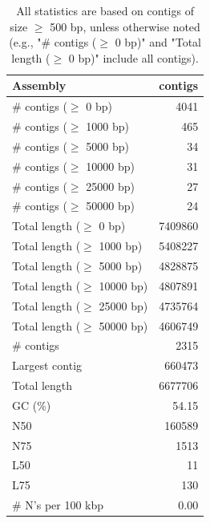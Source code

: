 \documentclass[12pt,a4paper]{article}
\begin{document}
\begin{table}[ht]
\begin{center}
\caption{All statistics are based on contigs of size $\geq$ 500 bp, unless otherwise noted (e.g., "\# contigs ($\geq$ 0 bp)" and "Total length ($\geq$ 0 bp)" include all contigs).}
\begin{tabular}{|l*{1}{|r}|}
\hline
Assembly & contigs \\ \hline
\# contigs ($\geq$ 0 bp) & 4041 \\ \hline
\# contigs ($\geq$ 1000 bp) & 465 \\ \hline
\# contigs ($\geq$ 5000 bp) & 34 \\ \hline
\# contigs ($\geq$ 10000 bp) & 31 \\ \hline
\# contigs ($\geq$ 25000 bp) & 27 \\ \hline
\# contigs ($\geq$ 50000 bp) & 24 \\ \hline
Total length ($\geq$ 0 bp) & 7409860 \\ \hline
Total length ($\geq$ 1000 bp) & 5408227 \\ \hline
Total length ($\geq$ 5000 bp) & 4828875 \\ \hline
Total length ($\geq$ 10000 bp) & 4807891 \\ \hline
Total length ($\geq$ 25000 bp) & 4735764 \\ \hline
Total length ($\geq$ 50000 bp) & 4606749 \\ \hline
\# contigs & 2315 \\ \hline
Largest contig & 660473 \\ \hline
Total length & 6677706 \\ \hline
GC (\%) & 54.15 \\ \hline
N50 & 160589 \\ \hline
N75 & 1513 \\ \hline
L50 & 11 \\ \hline
L75 & 130 \\ \hline
\# N's per 100 kbp & 0.00 \\ \hline
\end{tabular}
\end{center}
\end{table}
\end{document}
